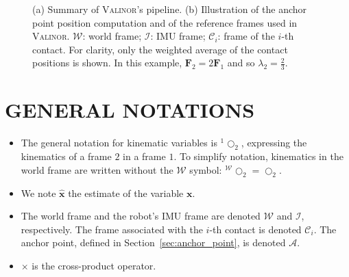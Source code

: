 \documentclass{IJCAS}
\begin{document}
\begin{figure}[]
      \hfill
    \caption{(a) Summary of {\scshape Valinor}'s pipeline. (b) Illustration of the anchor point position computation and of the reference frames used in {\scshape Valinor}. $\mathcal{W}$: world frame; $\mathcal{I}$: IMU frame; $\mathcal{C}_{i}$: frame of the $i$-th contact. For clarity, only the weighted average of the contact positions is shown. In this example, $\boldsymbol{F}_{2} = 2\boldsymbol{F}_{1}$ and so $\lambda_{2} = \frac{2}{3}$.}
\end{figure}


\section{GENERAL NOTATIONS}
\begin{itemize}[leftmargin=0pt]
    \item The general notation for kinematic variables is $^{1}\bigcirc_{2}$, expressing the kinematics of a frame $2$ in a frame $1$. To simplify notation, kinematics in the world frame are written without the $\mathcal{W}$ symbol: $^{\mathcal{W}}\bigcirc_{2}=\bigcirc_{2}$.
    \item We note $\hat{\boldsymbol{x}}$ the estimate of the variable $\boldsymbol{x}$.
    \item The world frame and the robot's IMU frame are denoted $\mathcal{W}$ and $\mathcal{I}$, respectively. The frame associated with the $i$-th contact is denoted $\mathcal{C}_{i}$. The anchor point, defined in Section~\ref{sec:anchor_point}, is denoted $\mathcal{A}$. 
    \item $\times$ is the cross-product operator.     
\end{itemize} 
\end{document}
